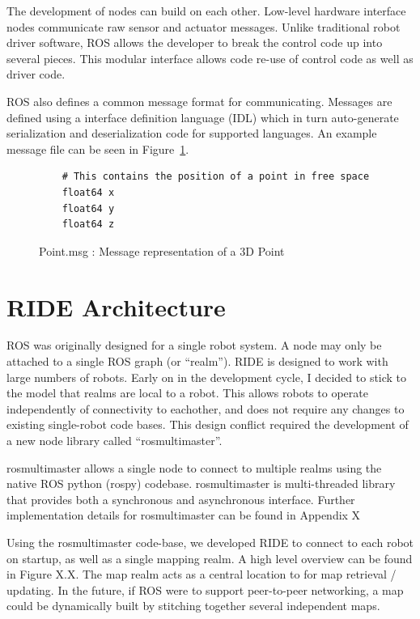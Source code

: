The development of nodes can build on each other. Low-level hardware interface nodes communicate raw sensor and actuator messages. Unlike traditional robot driver software, ROS allows the developer to break the control code up into several pieces. This modular interface allows code re-use of control code as well as driver code.

ROS also defines a common message format for communicating. Messages are defined using a interface definition language (IDL) which in turn auto-generate serialization and deserialization code for supported languages. An example message file can be seen in Figure~\ref{fig:point}.

\begin{figure}[ht]
\makebox[\textwidth]{\hrulefill}
\begin{verbatim}
	# This contains the position of a point in free space
	float64 x
	float64 y
	float64 z
\end{verbatim}
\makebox[\textwidth]{\hrulefill}
\caption{Point.msg : Message representation of a 3D Point\label{fig:point}}
\end{figure}

\section{RIDE Architecture}

ROS was originally designed for a single robot system. A node may only be attached to a single ROS graph (or ``realm''). RIDE is designed to work with large numbers of robots. Early on in the development cycle, I decided to stick to the model that realms are local to a robot. This allows robots to operate independently of connectivity to eachother, and does not require any changes to existing single-robot code bases. This design conflict required the development of a new node library called ``rosmultimaster''.

rosmultimaster allows a single node to connect to multiple realms using the native ROS python (rospy) codebase. rosmultimaster is multi-threaded library that provides both a synchronous and asynchronous interface. Further implementation details for rosmultimaster can be found in Appendix X %

Using the rosmultimaster code-base, we developed RIDE to connect to each robot on startup, as well as a single mapping realm. A high level overview can be found in Figure X.X. The map realm acts as a central location to for map retrieval / updating. In the future, if ROS were to support peer-to-peer networking, a map could be dynamically built by stitching together several independent maps. 

